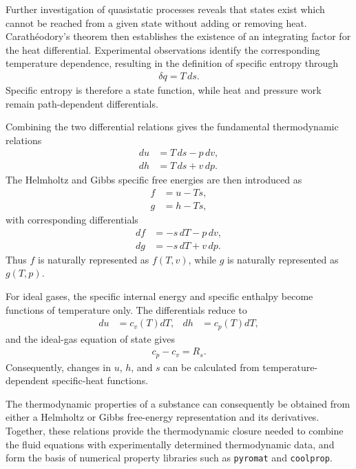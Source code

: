 Further investigation of quasistatic processes reveals that states exist which cannot be reached from a given state without adding or removing heat. Carath\'eodory's theorem then establishes the existence of an integrating factor for the heat differential. Experimental observations identify the corresponding temperature dependence, resulting in the definition of specific entropy through
\begin{align}
    \delta q = T\,ds.
\end{align}
Specific entropy is therefore a state function, while heat and pressure work remain path-dependent differentials.

Combining the two differential relations gives the fundamental thermodynamic relations
\begin{align}
    du &= T\,ds-p\,dv,\\
    dh &= T\,ds+v\,dp.
\end{align}
The Helmholtz and Gibbs specific free energies are then introduced as
\begin{align}
    f &= u-Ts,\\
    g &= h-Ts,
\end{align}
with corresponding differentials
\begin{align}
    df &= -s\,dT-p\,dv,\\
    dg &= -s\,dT+v\,dp.
\end{align}
Thus $f$ is naturally represented as $f(T,v)$, while $g$ is naturally represented as $g(T,p)$.

For ideal gases, the specific internal energy and specific enthalpy become functions of temperature only. The differentials reduce to
\begin{align}
    du&=c_v(T)dT, &
    dh&=c_p(T)dT,
\end{align}
and the ideal-gas equation of state gives
\begin{align}
    c_p-c_v=R_s.
\end{align}
Consequently, changes in $u$, $h$, and $s$ can be calculated from temperature-dependent specific-heat functions.

The thermodynamic properties of a substance can consequently be obtained from either a Helmholtz or Gibbs free-energy representation and its derivatives. Together, these relations provide the thermodynamic closure needed to combine the fluid equations with experimentally determined thermodynamic data, and form the basis of numerical property libraries such as \verb|pyromat| and \verb|coolprop|.


